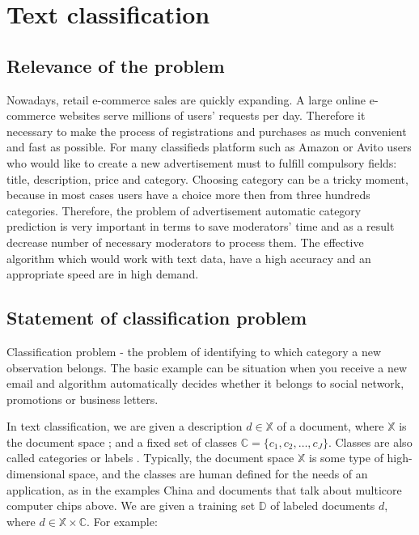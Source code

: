 \chapter{Text classification} \label{chapt1}

\section{Relevance of the problem} \label{sect1_1}

Nowadays, retail e-commerce sales are quickly expanding. A large online e-commerce
websites serve millions of users’ requests per day. Therefore it necessary to make the process of registrations and purchases as much convenient and fast as possible. For many classifieds platform such as Amazon or Avito users who would like to create a new advertisement must to fulfill compulsory fields: title, description, price and category. Choosing category can be a tricky moment, because in most cases users have a choice more then from three hundreds categories. Therefore, the problem  of advertisement automatic category prediction is very important in terms to save moderators' time and as a result decrease number of necessary moderators to process them. The effective algorithm which would work with text data, have a high accuracy and an appropriate speed are in high demand.

\section{Statement of classification problem} \label{sect1_2}


Classification problem - the problem of identifying to which category a new observation belongs. The basic example can be situation when you receive a new email and algorithm automatically decides whether it belongs to social network, promotions or business letters.


\newcommand{\docsetlabeled}{\mathbb{D}}

In text classification, we are given a description  $d \in \mathbb{X}$ of a document, where $\mathbb{X}$ is the document space ; and a fixed set of classes  $\mathbb{C} = \{ c_1,c_2,\ldots,c_J \}$. Classes are also called categories or labels . Typically, the document space  $\mathbb{X}$ is some type of high-dimensional space, and the classes are human defined for the needs of an application, as in the examples China and documents that talk about multicore computer chips above. We are given a training set  $\docsetlabeled$ of labeled documents  $d $, where  $d \in \mathbb{X} \times \mathbb{C}$. For example: 

